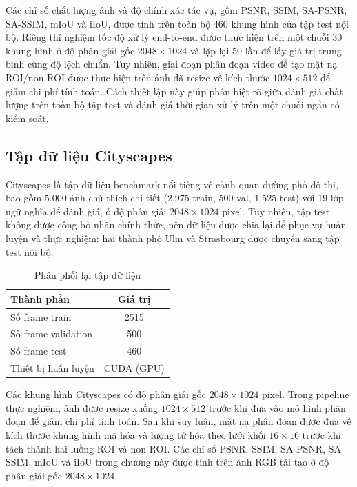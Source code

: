 Các chỉ số chất lượng ảnh và độ chính xác tác vụ, gồm PSNR, SSIM, SA-PSNR, SA-SSIM, mIoU và iIoU, được tính trên toàn bộ 460 khung hình của tập test nội bộ. Riêng thí nghiệm tốc độ xử lý end-to-end được thực hiện trên một chuỗi 30 khung hình ở độ phân giải gốc $2048\times1024$ và lặp lại 50 lần để lấy giá trị trung bình cùng độ lệch chuẩn.
Tuy nhiên, giai đoạn phân đoạn video để tạo mặt nạ ROI/non-ROI được thực hiện trên ảnh đã resize về kích thước $1024\times512$ để giảm chi phí tính toán.
Cách thiết lập này giúp phân biệt rõ giữa đánh giá chất lượng trên toàn bộ tập test và đánh giá thời gian xử lý trên một chuỗi ngắn có kiểm soát.

\subsection{Tập dữ liệu Cityscapes}
\label{subsec:dataset}

Cityscapes là tập dữ liệu benchmark nổi tiếng về cảnh quan đường phố đô thị, bao gồm 5.000 ảnh chú thích chi tiết (2.975 train, 500 val, 1.525 test) với 19 lớp ngữ nghĩa để đánh giá, ở độ phân giải $2048\times1024$ pixel. Tuy nhiên, tập test không được công bố nhãn chính thức, nên dữ liệu được chia lại để phục vụ huấn luyện và thực nghiệm: hai thành phố Ulm và Strasbourg được chuyển sang tập test nội bộ.

\begin{table}[H]
    \centering
    \caption{Phân phối lại tập dữ liệu}
    \label{tab:dataset}
    \begin{tabular}{lc}
        \toprule
        \textbf{Thành phần} & \textbf{Giá trị} \\
        \midrule
        Số frame train & 2515 \\
        Số frame validation & 500 \\
        Số frame test & 460 \\
        Thiết bị huấn luyện & CUDA (GPU) \\
        \bottomrule
    \end{tabular}
\end{table}

Các khung hình Cityscapes có độ phân giải gốc $2048\times1024$ pixel. Trong pipeline thực nghiệm, ảnh được resize xuống $1024\times512$ trước khi đưa vào mô hình phân đoạn để giảm chi phí tính toán. Sau khi suy luận, mặt nạ phân đoạn được đưa về kích thước khung hình mã hóa và lượng tử hóa theo lưới khối $16\times16$ trước khi tách thành hai luồng ROI và non-ROI. Các chỉ số PSNR, SSIM, SA-PSNR, SA-SSIM, mIoU và iIoU trong chương này được tính trên ảnh RGB tái tạo ở độ phân giải gốc $2048\times1024$.

